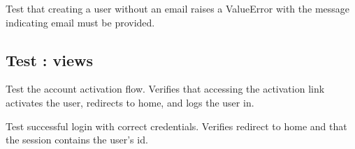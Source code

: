 \documentclass[letterpaper,10pt,english]{sphinxmanual}
\begin{document}

\begin{fulllineitems}
\label{\detokenize{users.tests:users.tests.test_models.test_create_user_without_email_raises}}
\pysigstartsignatures
\pysiglinewithargsret
{}
{}
{}
\pysigstopsignatures
\sphinxAtStartPar
Test that creating a user without an email raises a ValueError
with the message indicating email must be provided.

\end{fulllineitems}



\subsection{Test : views}
\label{\detokenize{users.tests:module-users.tests.test_views}}\label{\detokenize{users.tests:test-views}}

\begin{fulllineitems}
\label{\detokenize{users.tests:users.tests.test_views.test_account_activation}}
\pysigstartsignatures
\pysiglinewithargsret
{}
{}
{}
\pysigstopsignatures
\sphinxAtStartPar
Test the account activation flow.
Verifies that accessing the activation link activates the user,
redirects to home, and logs the user in.

\end{fulllineitems}


\begin{fulllineitems}
\label{\detokenize{users.tests:users.tests.test_views.test_login_success}}
\pysigstartsignatures
\pysiglinewithargsret
{}
{}
{}
\pysigstopsignatures
\sphinxAtStartPar
Test successful login with correct credentials.
Verifies redirect to home and that the session contains the user’s id.

\end{fulllineitems}
\end{document}
